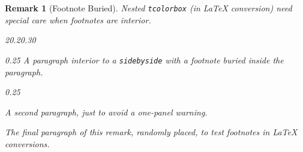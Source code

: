 \documentclass[pdflatex]{sn-jnl}
\theoremstyle{thmstyleone}%
\theoremstyle{thmstyletwo}%
\theoremstyle{thmstylethree}%
\newtheorem{remark}[theorem]{Remark}
\newcommand{\mono}[1]{\texttt{#1}}
\numberwithin{equation}{section}
\begin{document}
\begin{remark}[Footnote Buried]\label{section-graphics-3-7}%
%
Nested \mono{tcolorbox} (in \LaTeX{} conversion) need special care when footnotes are interior.%
\begin{sidebyside}{2}{0.2}{0.3}{0}%
\begin{sbspanel}{0.25}%
A paragraph interior to a \mono{sidebyside} with a footnote\footnotemark{} buried inside the paragraph.%
\end{sbspanel}%
\begin{sbspanel}{0.25}%
\par
A second paragraph, just to avoid a one-panel warning.%
\end{sbspanel}%
\end{sidebyside}%
\par
The final paragraph of this remark, randomly placed, to test footnotes in \LaTeX{} conversions.%
\end{remark}
%
%
%
\typeout{************************************************}
\typeout{************************************************}
%
\end{document}
